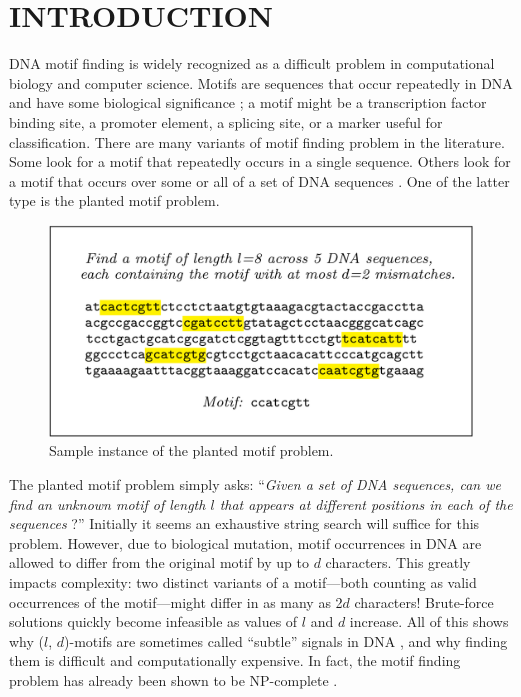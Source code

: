 \documentclass[oneside,12pt]{DISCSthesis}
\begin{document}
\chapter{INTRODUCTION}
		DNA motif finding is widely recognized as a difficult problem in computational biology and computer science. Motifs are sequences that occur repeatedly in DNA and have some biological significance \cite{das2007survey}; a motif might be a transcription factor binding site, a promoter element, a splicing site, or a marker useful for classification. There are many variants of motif finding problem in the literature. Some look for a motif that repeatedly occurs in a single sequence. Others look for a motif that occurs over some or all of a set of DNA sequences \cite{dasari2010efficient}. One of the latter type is the planted motif problem.\newline

		\begin{figure}[h] \label{fig:example}
			\centering
			\includegraphics[width=5.5in]{img/example}
			\caption{Sample instance of the planted motif problem.}
			\end{figure}

		The planted motif problem simply asks: ``\emph{Given a set of DNA sequences, can we find an unknown motif of length $l$ that appears at different positions in each of the sequences} \cite{pevzner2000combinatorial}?'' Initially it seems an exhaustive string search will suffice for this problem. However, due to biological mutation, motif occurrences in DNA are allowed to differ from the original motif by up to $d$ characters. This greatly impacts complexity: two distinct variants of a motif---both counting as valid occurrences of the motif---might differ in as many as 2$d$ characters! Brute-force solutions quickly become infeasible as values of $l$ and $d$ increase. All of this shows why ($l$, $d$)-motifs are sometimes called ``subtle'' signals in DNA  \cite{pevzner2000combinatorial}, and why finding them is difficult and computationally expensive. In fact, the motif finding problem has already been shown to be NP-complete \cite{pms2014}. 
\end{document}
